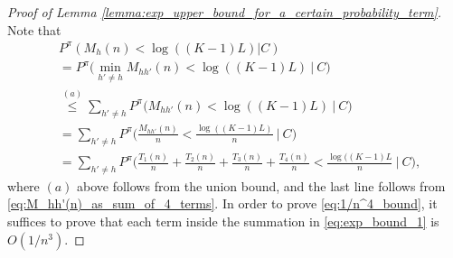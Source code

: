 \begin{proof}[Proof of Lemma \ref{lemma:exp_upper_bound_for_a_certain_probability_term}]
	Note that
	\begingroup\allowdisplaybreaks\begin{align}
	&P^\pi(M_h(n)<\log((K-1)L)|C)\nonumber\\
	&=P^\pi\bigg(\min\limits_{h'\neq h}M_{hh'}(n)<\log((K-1)L)~\bigg|~C\bigg)\nonumber\\
	&\stackrel{(a)}{\leq} \sum\limits_{h'\neq h}P^\pi\bigg(M_{hh'}(n)<\log((K-1)L)~\bigg|~C\bigg)\nonumber\\
	&=\sum\limits_{h'\neq h}P^\pi\bigg(\frac{M_{hh'}(n)}{n}<\frac{\log((K-1)L)}{n}~\bigg|~C\bigg)\nonumber\\
	&=\sum\limits_{h' \neq h}P^\pi\bigg(\frac{T_1(n)}{n}+\frac{T_2(n)}{n}+ \frac{T_3(n)}{n}+\frac{T_4(n)}{n}<\frac{\log((K-1)L}{n}~\bigg|~C\bigg),\label{eq:exp_bound_1}
\end{align}\endgroup
where $(a)$ above follows from the union bound, and the last line follows from \eqref{eq:M_hh'(n)_as_sum_of_4_terms}. In order to prove \eqref{eq:1/n^4_bound}, it suffices to prove that each term inside the summation in \eqref{eq:exp_bound_1} is $O(1/n^3)$.


\end{proof}
